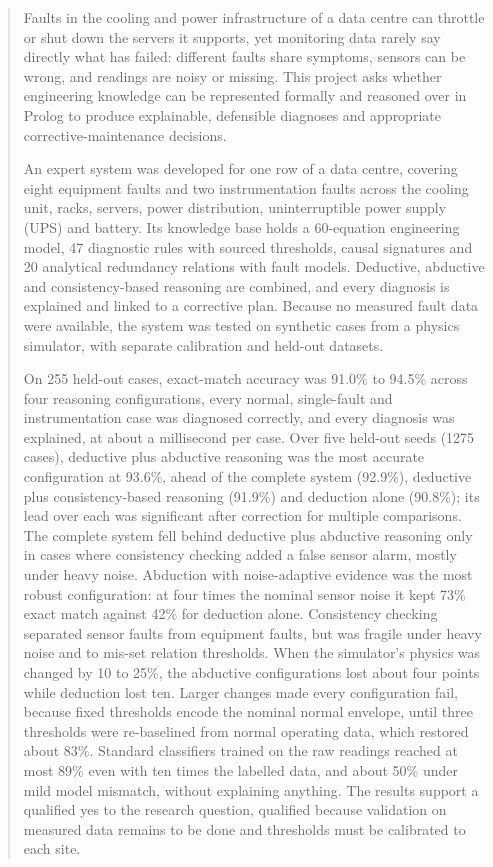 \documentclass[12pt,a4paper]{report}
\begin{document}
\begin{abstract}
Faults in the cooling and power infrastructure of a data centre can throttle or shut down the servers it supports, yet monitoring data rarely say directly what has failed: different faults share symptoms, sensors can be wrong, and readings are noisy or missing. This project asks whether engineering knowledge can be represented formally and reasoned over in Prolog to produce explainable, defensible diagnoses and appropriate corrective-maintenance decisions.

An expert system was developed for one row of a data centre, covering eight equipment faults and two instrumentation faults across the cooling unit, racks, servers, power distribution, uninterruptible power supply (UPS) and battery. Its knowledge base holds a 60-equation engineering model, 47 diagnostic rules with sourced thresholds, causal signatures and 20 analytical redundancy relations with fault models. Deductive, abductive and consistency-based reasoning are combined, and every diagnosis is explained and linked to a corrective plan. Because no measured fault data were available, the system was tested on synthetic cases from a physics simulator, with separate calibration and held-out datasets.

On 255 held-out cases, exact-match accuracy was 91.0\% to 94.5\% across four reasoning configurations, every normal, single-fault and instrumentation case was diagnosed correctly, and every diagnosis was explained, at about a millisecond per case. Over five held-out seeds (1275 cases), deductive plus abductive reasoning was the most accurate configuration at 93.6\%, ahead of the complete system (92.9\%), deductive plus consistency-based reasoning (91.9\%) and deduction alone (90.8\%); its lead over each was significant after correction for multiple comparisons. The complete system fell behind deductive plus abductive reasoning only in cases where consistency checking added a false sensor alarm, mostly under heavy noise. Abduction with noise-adaptive evidence was the most robust configuration: at four times the nominal sensor noise it kept 73\% exact match against 42\% for deduction alone. Consistency checking separated sensor faults from equipment faults, but was fragile under heavy noise and to mis-set relation thresholds. When the simulator's physics was changed by 10 to 25\%, the abductive configurations lost about four points while deduction lost ten. Larger changes made every configuration fail, because fixed thresholds encode the nominal normal envelope, until three thresholds were re-baselined from normal operating data, which restored about 83\%. Standard classifiers trained on the raw readings reached at most 89\% even with ten times the labelled data, and about 50\% under mild model mismatch, without explaining anything. The results support a qualified yes to the research question, qualified because validation on measured data remains to be done and thresholds must be calibrated to each site.
\end{abstract}
\end{document}
